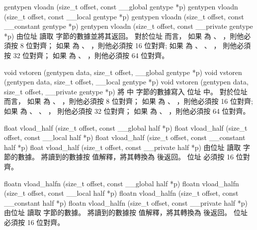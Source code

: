 

\stopbuffer
{}
\stopbuffer

gentypen vloadn (size_t offset, 
	const __global gentype *p) 
gentypen vloadn (size_t offset,
	const __local gentype *p)
gentypen vloadn (size_t offset,
	const __constant gentype *p)
gentypen vloadn (size_t offset,
	const __private gentype *p)
\stopbuffer
{}
由位址  讀取
  字節的數據並將其返回。
對於位址  而言，
如果  為 、 ，則他必須按 8 位對齊；
如果  為 、 ，則他必須按 16 位對齊;
如果  為 、 、 ，
則他必須按 32 位對齊；
如果  為 、 ，則他必須按 64 位對齊。
\stopbuffer

void vstoren (gentypen data,
	size_t offset,
	__global gentype *p)
void vstoren (gentypen data,
	size_t offset,
	__local gentype *p)
void vstoren (gentypen data,
	size_t offset,
	__private gentype *p)
\stopbuffer
{}
將  中
  字節的數據寫入
位址  中。
對於位址  而言，
如果  為 、 ，則他必須按 8 位對齊；
如果  為 、 ，則他必須按 16 位對齊;
如果  為 、 、 ，
則他必須按 32 位對齊；
如果  為 、 ，則他必須按 64 位對齊。
\stopbuffer

float vload_half (size_t offset,
	const __global half *p)
float vload_half (size_t offset,
	const __local half *p)
float vload_half (size_t offset,
	const __constant half *p)
float vload_half (size_t offset,
	const __private half *p)
\stopbuffer
{}
由位址  讀取
  字節的數據。
將讀到的數據按  值解釋，將其轉換為  後返回。
位址  必須按 16 位對齊。
\stopbuffer

floatn vload_halfn (size_t offset,
	const __global half *p)
floatn vload_halfn (size_t offset,
	const __local half *p)
floatn vload_halfn (size_t offset,
	const __constant half *p)
floatn vload_halfn (size_t offset,
	const __private half *p)
\stopbuffer
{}
由位址  讀取
  字節的數據。
將讀到的數據按  值解釋，將其轉換為  後返回。
位址  必須按 16 位對齊。
\stopbuffer

